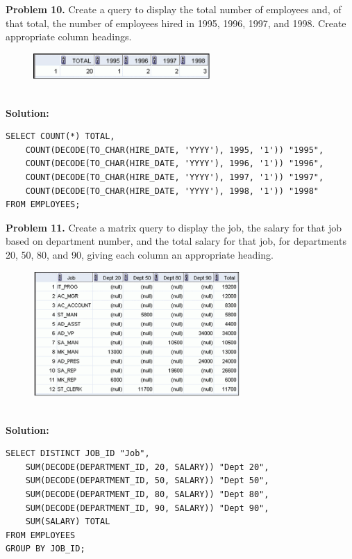 \documentclass[12pt,a4paper]{article}
\begin{document}
\vspace{0.5cm}
\newpage
\textbf{Problem 10.} Create a query to display the total number of employees and, of that total, the number of employees hired in 1995, 1996, 1997, and 1998. Create appropriate column headings.
\begin{figure}[htbp]
  \centering
  \includegraphics[width=0.6\textwidth]{Screenshots/510.png}
\end{figure}\\
\textbf{Solution:}
\begin{lstlisting}[style=sqlstyle]
SELECT COUNT(*) TOTAL,
    COUNT(DECODE(TO_CHAR(HIRE_DATE, 'YYYY'), 1995, '1')) "1995",
    COUNT(DECODE(TO_CHAR(HIRE_DATE, 'YYYY'), 1996, '1')) "1996",
    COUNT(DECODE(TO_CHAR(HIRE_DATE, 'YYYY'), 1997, '1')) "1997",
    COUNT(DECODE(TO_CHAR(HIRE_DATE, 'YYYY'), 1998, '1')) "1998"
FROM EMPLOYEES;
\end{lstlisting}

\vspace{0.5cm}

\textbf{Problem 11.} Create a matrix query to display the job, the salary for that job based on department number, and the total salary for that job, for departments 20, 50, 80, and 90, giving each column an appropriate heading.
\begin{figure}[htbp]
  \centering
  \includegraphics[width=0.7\textwidth]{Screenshots/511.png}
\end{figure}\\
\textbf{Solution:}
\begin{lstlisting}[style=sqlstyle]
SELECT DISTINCT JOB_ID "Job",
    SUM(DECODE(DEPARTMENT_ID, 20, SALARY)) "Dept 20",
    SUM(DECODE(DEPARTMENT_ID, 50, SALARY)) "Dept 50",
    SUM(DECODE(DEPARTMENT_ID, 80, SALARY)) "Dept 80",
    SUM(DECODE(DEPARTMENT_ID, 90, SALARY)) "Dept 90",
    SUM(SALARY) TOTAL
FROM EMPLOYEES
GROUP BY JOB_ID;
\end{lstlisting}
\end{document}
